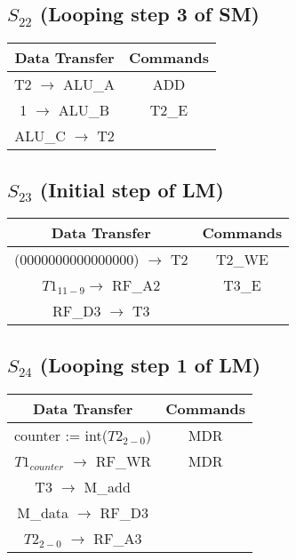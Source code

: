 \documentclass[]{article}
\begin{document}
            \subsection*{$S_{22}$ (Looping step 3 of SM)} %
            \begin{center}
                \begin{tabular}{|c|c|}
                    \hline
                    Data Transfer & Commands \\
                    \hline
                    T2 $\to$ ALU\_A & ADD\\
                    1 $\to$ ALU\_B & T2\_E\\
                    ALU\_C $\to$ T2 & \\
                    \hline
                \end{tabular}
            \end{center} 

            \subsection*{$S_{23}$ (Initial step of LM)} %
            \begin{center}
                \begin{tabular}{|c|c|}
                    \hline
                    Data Transfer & Commands \\
                    \hline
                    (0000000000000000) $\to$ T2 & T2\_WE\\
                    $T1_{11-9} \to$ RF\_A2 & T3\_E\\
                    RF\_D3 $\to$ T3 & \\     %
                    \hline
                \end{tabular}
            \end{center}    

            \subsection*{$S_{24}$ (Looping step 1 of LM)} %
            \begin{center}
                \begin{tabular}{|c|c|}
                    \hline
                    Data Transfer & Commands \\
                    \hline
                    counter := int($T2_{2-0}$) & MDR\\
                    $T1_{counter}$ $\to$ RF\_WR & MDR \\
                    T3 $\to$ M\_add & \\
                    M\_data $\to$ RF\_D3 & \\
                    $T2_{2-0}$ $\to$ RF\_A3 & \\
                    \hline
                \end{tabular}
            \end{center} 
\end{document}
